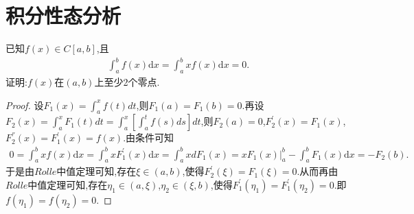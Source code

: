 \documentclass[../../main.tex]{subfiles}
\begin{document}
\section{积分性态分析}

\begin{example}
已知$f(x)\in C[a,b]$,且
\begin{align*}
\int_a^b{f\left( x \right) \mathrm{d}x}=\int_a^b{xf\left( x \right) \mathrm{d}x}=0.
\end{align*}
证明:$f(x)$在$(a,b)$上至少2个零点.
\end{example}
\begin{proof}
设\(F_1(x)=\int_a^x f(t)dt\),则\(F_1(a)=F_1(b)=0\).再设\(F_2(x)=\int_a^x F_1(t)dt=\int_a^x\left[\int_a^t f(s)ds\right]dt\),则\(F_2(a)=0\),\(F_{2}^{\prime}(x)=F_1(x)\),\(F_{2}^{''}(x)=F_{1}^{\prime}(x)=f(x)\).由条件可知
\begin{align*}
0=\int_a^b xf(x)\mathrm{d}x
=\int_a^b xF_{1}^{\prime}(x)\mathrm{d}x
=\int_a^b xdF_1(x)
=xF_1(x)\Big|_{a}^{b}-\int_a^b F_1(x)\mathrm{d}x
=-F_2(b).
\end{align*}
于是由\(Rolle\)中值定理可知,存在\(\xi\in(a,b)\),使得\(F_{2}^{\prime}(\xi)=F_1(\xi)=0\).从而再由\(Rolle\)中值定理可知,存在\(\eta_1\in(a,\xi)\),\(\eta_2\in(\xi,b)\),使得\(F_{1}^{\prime}(\eta_1)=F_{1}^{\prime}(\eta_2)=0\).即\(f(\eta_1)=f(\eta_2)=0\).
\end{proof}
\end{document}
